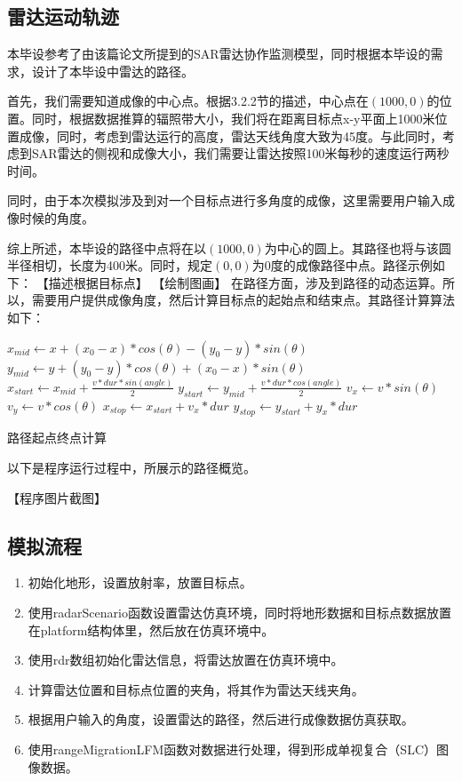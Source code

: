 \documentclass{xduugthesis}
\begin{document}
\subsection{雷达运动轨迹}
本毕设参考了由该篇论文\cite{SAR_Observation_Model}所提到的SAR雷达协作监测模型，同时根据本毕设的需求，设计了本毕设中雷达的路径。\par
首先，我们需要知道成像的中心点。根据3.2.2节的描述，中心点在$(1000,0)$的位置。同时，根据数据推算的辐照带大小，我们将在距离目标点x-y平面上1000米位置成像，同时，考虑到雷达运行的高度，雷达天线角度大致为45度。与此同时，考虑到SAR雷达的侧视和成像大小，我们需要让雷达按照100米每秒的速度运行两秒时间。\par
同时，由于本次模拟涉及到对一个目标点进行多角度的成像，这里需要用户输入成像时候的角度。\par
综上所述，本毕设的路径中点将在以$(1000,0)$为中心的圆上。其路径也将与该圆半径相切，长度为400米。同时，规定$(0,0)$为0度的成像路径中点。路径示例如下：
【描述根据目标点】
【绘制图画】
在路径方面，涉及到路径的动态运算。所以，需要用户提供成像角度，然后计算目标点的起始点和结束点。其路径计算算法如下：\par
\IncMargin{1em}
\begin{algorithm}
	
	$x_{mid} \leftarrow x + (x_0 - x) * cos(\theta) - (y_0 - y) * sin(\theta)$\;
	$y_{mid} \leftarrow y + (y_0 - y) * cos(\theta) + (x_0 - x) * sin(\theta)$\;
	$x_{start} \leftarrow x_{mid} + \frac{v * dur * sin(angle)}{2} $\;
	$y_{start} \leftarrow y_{mid} + \frac{v * dur * cos(angle)}{2} $\;
	$v_x \leftarrow v * sin(\theta)$\;
	$v_y \leftarrow v * cos(\theta)$\;
	$x_{stop} \leftarrow x_{start} + v_x * dur $\;
	$y_{stop} \leftarrow y_{start} + y_x * dur $\;
	\caption{路径起点终点计算}
\end{algorithm}
\DecMargin{1em}

以下是程序运行过程中，所展示的路径概览。\par
【程序图片截图】
\subsection{模拟流程}
\begin{enumerate}
	\item 初始化地形，设置放射率，放置目标点。
	\item 使用radarScenario函数设置雷达仿真环境，同时将地形数据和目标点数据放置在platform结构体里，然后放在仿真环境中。
	\item 使用rdr数组初始化雷达信息，将雷达放置在仿真环境中。
	\item 计算雷达位置和目标点位置的夹角，将其作为雷达天线夹角。
	\item 根据用户输入的角度，设置雷达的路径，然后进行成像数据仿真获取。
	\item 使用rangeMigrationLFM函数对数据进行处理，得到形成单视复合（SLC）图像数据。
\end{enumerate}
\end{document}
